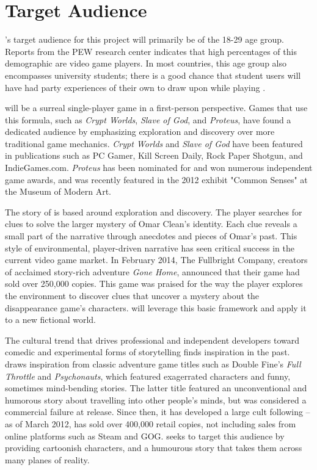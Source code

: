 \section{Target Audience}
\ourteam{}'s target audience for this project will primarily be of the 18-29 age group. Reports from the PEW research center indicates that high percentages of this demographic are video game players. In most countries, this age group also encompasses university students; there is a good chance that student users will have had party experiences of their own to draw upon while playing \ourgame{}.

\ourgame{} will be a surreal single-player game in a first-person perspective. Games that use this formula, such as \textit{Crypt Worlds}, \textit{Slave of God}, and \textit{Proteus}, have found a dedicated audience by emphasizing exploration and discovery over more traditional game mechanics. \textit{Crypt Worlds} and \textit{Slave of God} have been featured in publications such as PC Gamer, Kill Screen Daily, Rock Paper Shotgun, and IndieGames.com. \textit{Proteus} has been nominated for and won numerous independent game awards, and was recently featured in the 2012 exhibit "Common Senses" at the Museum of Modern Art.

The story of \ourgame{} is based around exploration and discovery. The player searches for clues to solve the larger mystery of Omar Clean's identity. Each clue reveals a small part of the narrative through anecdotes and pieces of Omar's past. This style of environmental, player-driven narrative has seen critical success in the current video game market. In February 2014, The Fullbright Company, creators of acclaimed story-rich adventure \textit{Gone Home}, announced that their game had sold over 250,000 copies. This game was praised for the way the player explores the environment to discover clues that uncover a mystery about the disappearance game's characters. \ourgame{} will leverage this basic framework and apply it to a new fictional world.

The cultural trend that drives professional and independent developers toward comedic and experimental forms of storytelling finds inspiration in the past. \ourgame{} draws inspiration from classic adventure game titles such as Double Fine's \textit{Full Throttle} and  \textit{Psychonauts}, which featured exagerrated characters and funny, sometimes mind-bending stories. The latter title featured an unconventional and humorous story about travelling into other people's minds, but was considered a commercial failure at release. Since then, it has developed a large cult following -- as of March 2012, has sold over 400,000 retail copies, not including sales from online platforms such as Steam and GOG. \ourgame{} seeks to target this audience by providing cartoonish characters, and a humourous story that takes them across many planes of reality.

